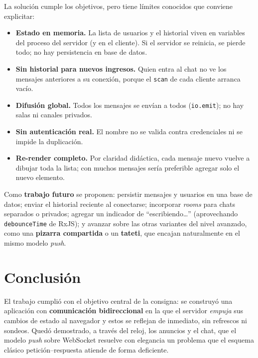 \documentclass[12pt,a4paper]{article}
\begin{document}
La solución cumple los objetivos, pero tiene límites conocidos que conviene explicitar:
\begin{itemize}[leftmargin=1.4em]
    \item \textbf{Estado en memoria.} La lista de usuarios y el historial viven en variables del proceso del servidor (y en el cliente). Si el servidor se reinicia, se pierde todo; no hay persistencia en base de datos.
    \item \textbf{Sin historial para nuevos ingresos.} Quien entra al chat no ve los mensajes anteriores a su conexión, porque el \texttt{scan} de cada cliente arranca vacío.
    \item \textbf{Difusión global.} Todos los mensajes se envían a todos (\texttt{io.emit}); no hay salas ni canales privados.
    \item \textbf{Sin autenticación real.} El nombre no se valida contra credenciales ni se impide la duplicación.
    \item \textbf{Re-render completo.} Por claridad didáctica, cada mensaje nuevo vuelve a dibujar toda la lista; con muchos mensajes sería preferible agregar solo el nuevo elemento.
\end{itemize}

Como \textbf{trabajo futuro} se proponen: persistir mensajes y usuarios en una base de datos; enviar el historial reciente al conectarse; incorporar \textit{rooms} para chats separados o privados; agregar un indicador de ``escribiendo\dots'' (aprovechando \texttt{debounceTime} de RxJS); y avanzar sobre las otras variantes del nivel avanzado, como una \textbf{pizarra compartida} o un \textbf{tateti}, que encajan naturalmente en el mismo modelo \textit{push}.

\section{Conclusión}

El trabajo cumplió con el objetivo central de la consigna: se construyó una aplicación con \textbf{comunicación bidireccional} en la que el servidor \emph{empuja} sus cambios de estado al navegador y estos se reflejan de inmediato, sin refrescos ni sondeos. Quedó demostrado, a través del reloj, los anuncios y el chat, que el modelo \textit{push} sobre WebSocket resuelve con elegancia un problema que el esquema clásico petición--respuesta atiende de forma deficiente.
\end{document}
